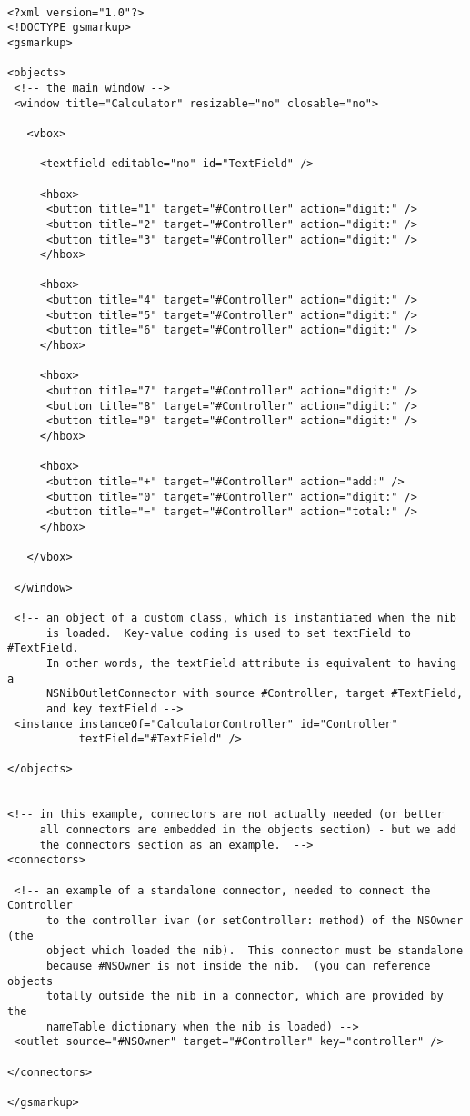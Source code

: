 \begin{verbatim}

<?xml version="1.0"?>
<!DOCTYPE gsmarkup>
<gsmarkup>

<objects>
 <!-- the main window -->
 <window title="Calculator" resizable="no" closable="no">

   <vbox>

     <textfield editable="no" id="TextField" />

     <hbox>
      <button title="1" target="#Controller" action="digit:" />
      <button title="2" target="#Controller" action="digit:" />
      <button title="3" target="#Controller" action="digit:" />
     </hbox>

     <hbox>
      <button title="4" target="#Controller" action="digit:" />
      <button title="5" target="#Controller" action="digit:" />
      <button title="6" target="#Controller" action="digit:" />
     </hbox>

     <hbox>
      <button title="7" target="#Controller" action="digit:" />
      <button title="8" target="#Controller" action="digit:" />
      <button title="9" target="#Controller" action="digit:" />
     </hbox>

     <hbox>
      <button title="+" target="#Controller" action="add:" />
      <button title="0" target="#Controller" action="digit:" />
      <button title="=" target="#Controller" action="total:" />
     </hbox>

   </vbox>

 </window>

 <!-- an object of a custom class, which is instantiated when the nib
      is loaded.  Key-value coding is used to set textField to #TextField.
      In other words, the textField attribute is equivalent to having a
      NSNibOutletConnector with source #Controller, target #TextField, 
      and key textField -->
 <instance instanceOf="CalculatorController" id="Controller" 
           textField="#TextField" />

</objects>


<!-- in this example, connectors are not actually needed (or better
     all connectors are embedded in the objects section) - but we add
     the connectors section as an example.  -->
<connectors>

 <!-- an example of a standalone connector, needed to connect the Controller
      to the controller ivar (or setController: method) of the NSOwner (the
      object which loaded the nib).  This connector must be standalone
      because #NSOwner is not inside the nib.  (you can reference objects
      totally outside the nib in a connector, which are provided by the
      nameTable dictionary when the nib is loaded) -->
 <outlet source="#NSOwner" target="#Controller" key="controller" />

</connectors>

</gsmarkup>
\end{verbatim}
